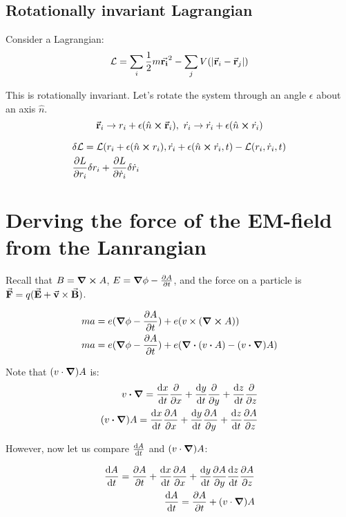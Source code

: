 \subsection{Rotationally invariant Lagrangian}

Consider a Lagrangian:
$$\mathcal{L} = \sum_i \frac{1}{2} m \va{r_i}^2 - \sum_j V(|\va r_i - \va r_j|)$$

This is rotationally invariant. Let's rotate the system
through an angle $\epsilon$ about an axis $\hat n$.
$$
\va r_i \to r_i + \epsilon (\hat n \cross \va r_i),~
\dot{r_i} \to \dot{r_i} + \epsilon (\hat n \cross \dot{  r_i})
$$

\begin{align*}
&\delta \mathcal{L} = \mathcal{L}(r_i + \epsilon (\hat n \cross r_i), \dot{r_i} + \epsilon (\hat n \cross \dot{ r_i}, t)
- \mathcal{L}(r_i, \dot r_i, t) \\
&\pdv{L}{r_i} \delta r_i + \pdv{L}{\dot r_i} \delta {\dot r_i}
\end{align*}

\section{Derving the force of the EM-field from the Lanrangian}

Recall that $B = \curl A$, $E = \grad \phi - \pdv{A}{t}$, and the force
on a particle is $\va F = q (\va E + \va v \times \va B)$.

\begin{align*}
ma &= e (\grad \phi - \pdv{A}{t}) + e (v \times (\curl A)) \\
ma &= e (\grad \phi - \pdv{A}{t}) + e (\div (v \vdot A) - (v \vdot \grad) A)
\end{align*}

Note that $(v \cdot \grad) A$ is:
\begin{align*}
v \vdot \grad = \dv{x}{t} \pdv{x} + \dv{y}{t} \pdv{y} + \dv{z}{t} \pdv{z} \\
(v \vdot \grad) A = \dv{x}{t} \pdv{A}{x} + \dv{y}{t} \pdv{A}{y} + \dv{z}{t} \pdv{A}{z} \\
\end{align*}

However, now let us compare $\dv{A}{t}$ and $(v \cdot \grad) A$:

\begin{align*}
\dv{A}{t} = \pdv{A}{t} + \dv{x}{t}\pdv{A}{x} + \dv{y}{t}\pdv{A}{y} \dv{z}{t}\pdv{A}{z} \\
\dv{A}{t} = \pdv{A}{t} + (v \cdot \grad) A
\end{align*}

